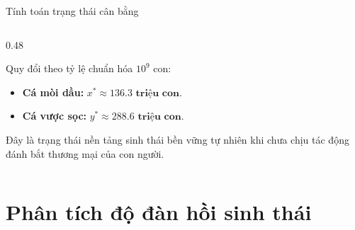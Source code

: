 \documentclass[aspectratio=169, 10pt]{beamer}
\begin{document}
\begin{frame}{Tính toán trạng thái cân bằng }
\begin{columns}[c]
    \begin{column}{0.48\textwidth}
      \begin{tcolorbox}[colback=OceanLight, colframe=OceanTeal, arc=2mm, title=\textbf{Ý nghĩa thực tế cho Vịnh Chesapeake}]
        \footnotesize
        Quy đổi theo tỷ lệ chuẩn hóa $10^9$ con:
        \begin{itemize}
          \item \textbf{Cá mòi dầu:} $x^* \approx \mathbf{136.3\text{ triệu con}}$.
          \item \textbf{Cá vược sọc:} $y^* \approx \mathbf{288.6\text{ triệu con}}$.
        \end{itemize}
        Đây là trạng thái nền tảng sinh thái bền vững tự nhiên khi chưa chịu tác động đánh bắt thương mại của con người.
      \end{tcolorbox}
    \end{column}
  \end{columns}
\end{frame}

\section{Phân tích độ đàn hồi sinh thái}
\end{document}
